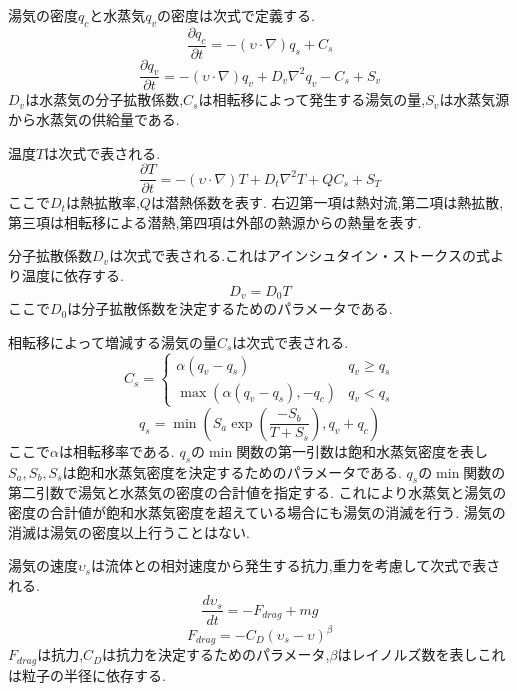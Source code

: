 \documentclass[submit,techrep]{ipsj}
\begin{document}
湯気の密度$q_{c}$と水蒸気$q_{v}$の密度は次式で定義する.
\begin{equation}
\label{steam}
\frac{\partial q_{c}}{\partial t} = -(\upsilon \cdot \nabla)q_{s} + C_{s}
\end{equation}
\begin{equation}
\label{vapor}
\frac{\partial q_{v}}{\partial t} = -(\upsilon \cdot \nabla)q_{v} + D_{v}\nabla^2q_{v} - C_{s} + S_{v}
\end{equation}
$D_{v}$は水蒸気の分子拡散係数,$C_{s}$は相転移によって発生する湯気の量,$S_{v}$は水蒸気源から水蒸気の供給量である.

温度$T$は次式で表される.
\begin{equation}
\label{temperature}
\frac{\partial T}{\partial t} = - (\upsilon \cdot \nabla)T + D_{t}\nabla^2T +  QC_{s} + S_{T}
\end{equation}
ここで$D_{t}$は熱拡散率,$Q$は潜熱係数を表す.
右辺第一項は熱対流,第二項は熱拡散,第三項は相転移による潜熱,第四項は外部の熱源からの熱量を表す.

分子拡散係数$D_{v}$は次式で表される.これはアインシュタイン・ストークスの式より温度に依存する.
\begin{equation}
\label{diffusion}
D_{v}=D_{0}T
\end{equation}
ここで$D_{0}$は分子拡散係数を決定するためのパラメータである.

相転移によって増減する湯気の量$C_{s}$は次式で表される.
\begin{equation}
\label{transition} 
C_{s} =
\begin{cases}
 \alpha(q_{v}-q_{s}) & q_{v} \geq q_{s}\\
 \max\left(\alpha(q_{v}-q_{s}),-q_{c}\right) & q_{v} < q_{s}
\end{cases}
\end{equation}
\begin{equation}
\label{saturation}
q_{s} = \min\left(S_{a} \exp\left(\frac{-S_{b}}{T+S_{s}}\right),q_{v}+q_{c}\right)
\end{equation}
ここで$\alpha$は相転移率である.
$q_{s}$の$\min$関数の第一引数は飽和水蒸気密度を表し
$S_{a},S_{b},S_{s}$は飽和水蒸気密度を決定するためのパラメータである.
$q_{s}$の$\min$関数の第二引数で湯気と水蒸気の密度の合計値を指定する.
これにより水蒸気と湯気の密度の合計値が飽和水蒸気密度を超えている場合にも湯気の消滅を行う.
湯気の消滅は湯気の密度以上行うことはない.

湯気の速度$\upsilon_{s}$は流体との相対速度から発生する抗力,重力を考慮して次式で表される.
\begin{equation}
\label{lagurange}
\frac{d\upsilon_{s}}{dt} = - F_{drag} + mg
\end{equation}
\begin{equation}
\label{dragforce}
F_{drag} = - C_{D} (\upsilon_{s} - \upsilon)^\beta
\end{equation}
$F_{drag}$は抗力,$C_{D}$は抗力を決定するためのパラメータ,$\beta$はレイノルズ数を表しこれは粒子の半径に依存する.
\end{document}
